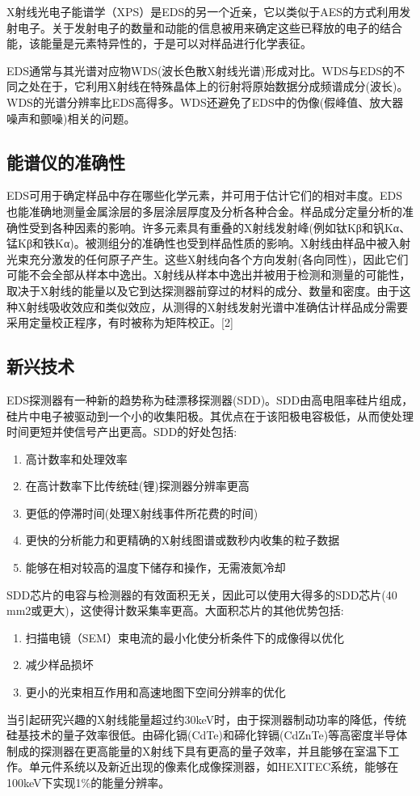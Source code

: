 X射线光电子能谱学（XPS）是EDS的另一个近亲，它以类似于AES的方式利用发射电子。关于发射电子的数量和动能的信息被用来确定这些已释放的电子的结合能，该能量是元素特异性的，于是可以对样品进行化学表征。

EDS通常与其光谱对应物WDS(波长色散X射线光谱)形成对比。WDS与EDS的不同之处在于，它利用X射线在特殊晶体上的衍射将原始数据分成频谱成分(波长)。WDS的光谱分辨率比EDS高得多。WDS还避免了EDS中的伪像(假峰值、放大器噪声和颤噪)相关的问题。

\subsection{能谱仪的准确性}
EDS可用于确定样品中存在哪些化学元素，并可用于估计它们的相对丰度。EDS也能准确地测量金属涂层的多层涂层厚度及分析各种合金。样品成分定量分析的准确性受到各种因素的影响。许多元素具有重叠的X射线发射峰(例如钛Kβ和钒Kα、锰Kβ和铁Kα)。被测组分的准确性也受到样品性质的影响。X射线由样品中被入射光束充分激发的任何原子产生。这些X射线向各个方向发射(各向同性)，因此它们可能不会全部从样本中逸出。X射线从样本中逸出并被用于检测和测量的可能性，取决于X射线的能量以及它到达探测器前穿过的材料的成分、数量和密度。由于这种X射线吸收效应和类似效应，从测得的X射线发射光谱中准确估计样品成分需要采用定量校正程序，有时被称为矩阵校正。[2]

\subsection{新兴技术}
EDS探测器有一种新的趋势称为硅漂移探测器(SDD)。SDD由高电阻率硅片组成，硅片中电子被驱动到一个小的收集阳极。其优点在于该阳极电容极低，从而使处理时间更短并使信号产出更高。SDD的好处包括:
\begin{enumerate}
\item 高计数率和处理效率
\item 在高计数率下比传统硅(锂)探测器分辨率更高
\item 更低的停滞时间(处理X射线事件所花费的时间)
\item 更快的分析能力和更精确的X射线图谱或数秒内收集的粒子数据
\item 能够在相对较高的温度下储存和操作，无需液氮冷却
\end{enumerate}
SDD芯片的电容与检测器的有效面积无关，因此可以使用大得多的SDD芯片(40 mm2或更大)，这使得计数采集率更高。大面积芯片的其他优势包括:
\begin{enumerate}
\item 扫描电镜（SEM）束电流的最小化使分析条件下的成像得以优化
\item 减少样品损坏
\item 更小的光束相互作用和高速地图下空间分辨率的优化
\end{enumerate}
当引起研究兴趣的X射线能量超过约30keV时，由于探测器制动功率的降低，传统硅基技术的量子效率很低。由碲化镉(CdTe)和碲化锌镉(CdZnTe)等高密度半导体制成的探测器在更高能量的X射线下具有更高的量子效率，并且能够在室温下工作。单元件系统以及新近出现的像素化成像探测器，如HEXITEC系统，能够在100keV下实现1\%的能量分辨率。

